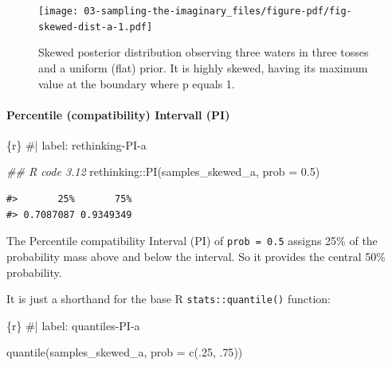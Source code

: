 \documentclass[
  letterpaper,
  DIV=11,
  numbers=noendperiod]{scrreprt}
\let\oldparagraph\paragraph
\renewcommand{\paragraph}[1]{\oldparagraph{#1}\mbox{}}
\newenvironment{Shaded}{\begin{snugshade}}{\end{snugshade}}
\newcommand{\AttributeTok}[1]{\textcolor[rgb]{0.40,0.45,0.13}{#1}}
\newcommand{\CommentTok}[1]{\textcolor[rgb]{0.37,0.37,0.37}{#1}}
\newcommand{\DecValTok}[1]{\textcolor[rgb]{0.68,0.00,0.00}{#1}}
\newcommand{\DocumentationTok}[1]{\textcolor[rgb]{0.37,0.37,0.37}{\textit{#1}}}
\newcommand{\FloatTok}[1]{\textcolor[rgb]{0.68,0.00,0.00}{#1}}
\newcommand{\FunctionTok}[1]{\textcolor[rgb]{0.28,0.35,0.67}{#1}}
\newcommand{\InformationTok}[1]{\textcolor[rgb]{0.37,0.37,0.37}{#1}}
\newcommand{\NormalTok}[1]{\textcolor[rgb]{0.00,0.23,0.31}{#1}}
\newcommand{\SpecialCharTok}[1]{\textcolor[rgb]{0.37,0.37,0.37}{#1}}
\begin{document}
\begin{figure}[H]

{\centering \texttt{[image: 03-sampling-the-imaginary\_files/figure-pdf/fig-skewed-dist-a-1.pdf]}

}

\caption{\label{fig-skewed-dist-a}Skewed posterior distribution
observing three waters in three tosses and a uniform (flat) prior. It is
highly skewed, having its maximum value at the boundary where p equals
1.}

\end{figure}

\hypertarget{percentile-compatibility-intervall-pi}{%
\paragraph{Percentile (compatibility) Intervall
(PI)}\label{percentile-compatibility-intervall-pi}}

\begin{Shaded}
\begin{Highlighting}[]
\InformationTok{\textasciigrave{}\textasciigrave{}\textasciigrave{}\{r\}}
\CommentTok{\#| label: rethinking{-}PI{-}a}

\DocumentationTok{\#\# R code 3.12}
\NormalTok{rethinking}\SpecialCharTok{::}\FunctionTok{PI}\NormalTok{(samples\_skewed\_a, }\AttributeTok{prob =} \FloatTok{0.5}\NormalTok{)}
\InformationTok{\textasciigrave{}\textasciigrave{}\textasciigrave{}}
\end{Highlighting}
\end{Shaded}

\begin{verbatim}
#>       25%       75% 
#> 0.7087087 0.9349349
\end{verbatim}

The Percentile compatibility Interval (PI) of \texttt{prob\ =\ 0.5}
assigns 25\% of the probability mass above and below the interval. So it
provides the central 50\% probability.

It is just a shorthand for the base R \texttt{stats::quantile()}
function:

\begin{Shaded}
\begin{Highlighting}[]
\InformationTok{\textasciigrave{}\textasciigrave{}\textasciigrave{}\{r\}}
\CommentTok{\#| label: quantiles{-}PI{-}a}

\FunctionTok{quantile}\NormalTok{(samples\_skewed\_a, }\AttributeTok{prob =} \FunctionTok{c}\NormalTok{(.}\DecValTok{25}\NormalTok{, .}\DecValTok{75}\NormalTok{))}
\InformationTok{\textasciigrave{}\textasciigrave{}\textasciigrave{}}
\end{Highlighting}
\end{Shaded}
\end{document}

